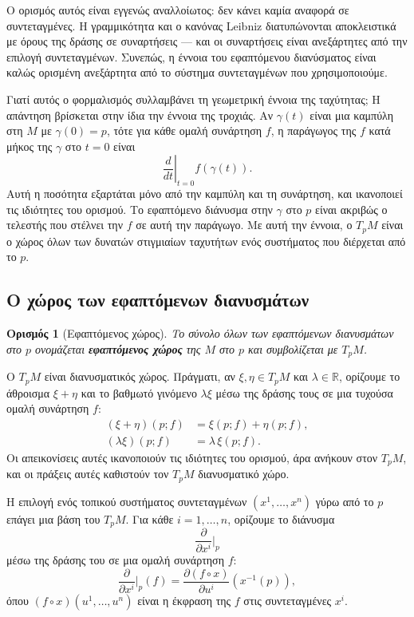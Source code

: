 \documentclass[11pt,a4paper,twoside,openright]{book}
\newtheorem{definition}[lemma]{Ορισμός}
\begin{document}
Ο ορισμός αυτός είναι εγγενώς αναλλοίωτος: δεν κάνει καμία αναφορά σε συντεταγμένες. Η γραμμικότητα και ο κανόνας Leibniz διατυπώνονται αποκλειστικά με όρους της δράσης σε συναρτήσεις --- και οι συναρτήσεις είναι ανεξάρτητες από την επιλογή συντεταγμένων. Συνεπώς, η έννοια του εφαπτόμενου διανύσματος είναι καλώς ορισμένη ανεξάρτητα από το σύστημα συντεταγμένων που χρησιμοποιούμε.

Γιατί αυτός ο φορμαλισμός συλλαμβάνει τη γεωμετρική έννοια της ταχύτητας; Η απάντηση βρίσκεται στην ίδια την έννοια της τροχιάς. Αν $\gamma(t)$ είναι μια καμπύλη στη $M$ με $\gamma(0) = p$, τότε για κάθε ομαλή συνάρτηση $f$, η παράγωγος της $f$ κατά μήκος της $\gamma$ στο $t = 0$ είναι
\begin{equation}
\left. \frac{d}{dt} \right|_{t=0} f(\gamma(t)).
\end{equation}
Αυτή η ποσότητα εξαρτάται μόνο από την καμπύλη και τη συνάρτηση, και ικανοποιεί τις ιδιότητες του ορισμού. Το εφαπτόμενο διάνυσμα στην $\gamma$ στο $p$ είναι ακριβώς ο τελεστής που στέλνει την $f$ σε αυτή την παράγωγο. Με αυτή την έννοια, ο $T_pM$ είναι ο χώρος όλων των δυνατών στιγμιαίων ταχυτήτων ενός συστήματος που διέρχεται από το $p$.

\subsection{Ο χώρος των εφαπτόμενων διανυσμάτων}

\begin{definition}[Εφαπτόμενος χώρος]
Το σύνολο όλων των εφαπτόμενων διανυσμάτων στο $p$ ονομάζεται \textbf{εφαπτόμενος χώρος} της $M$ στο $p$ και συμβολίζεται με $T_pM$.
\end{definition}

Ο $T_pM$ είναι διανυσματικός χώρος. Πράγματι, αν $\xi, \eta \in T_pM$ και $\lambda \in \mathbb{R}$, ορίζουμε το άθροισμα $\xi + \eta$ και το βαθμωτό γινόμενο $\lambda \xi$ μέσω της δράσης τους σε μια τυχούσα ομαλή συνάρτηση $f$:
\begin{align}
(\xi + \eta)(p; f) &= \xi(p; f) + \eta(p; f), \\
(\lambda \xi)(p; f) &= \lambda \, \xi(p; f).
\end{align}
Οι απεικονίσεις αυτές ικανοποιούν τις ιδιότητες του ορισμού, άρα ανήκουν στον $T_pM$, και οι πράξεις αυτές καθιστούν τον $T_pM$ διανυσματικό χώρο.

Η επιλογή ενός τοπικού συστήματος συντεταγμένων $(x^1, \dots, x^n)$ γύρω από το $p$ επάγει μια βάση του $T_pM$. Για κάθε $i = 1, \dots, n$, ορίζουμε το διάνυσμα
\[
\frac{\partial}{\partial x^i}\bigg|_p
\]
μέσω της δράσης του σε μια ομαλή συνάρτηση $f$:
\begin{equation}
\frac{\partial}{\partial x^i}\bigg|_p (f) = \frac{\partial (f \circ x)}{\partial u^i}(x^{-1}(p)),
\end{equation}
όπου $(f \circ x)(u^1, \dots, u^n)$ είναι η έκφραση της $f$ στις συντεταγμένες $x^i$.
\end{document}

